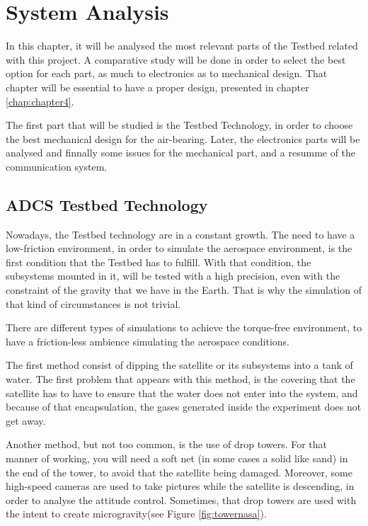 \chapter{System Analysis}
\label{chap:chapter3}

In this chapter, it will be analysed the most relevant parts of the Testbed related with this project. A comparative study will be done in order to select the best option for each part, as much to electronics as to mechanical design. That chapter will be essential to have a proper design, presented in chapter \ref{chap:chapter4}.

The first part that will be studied is the Testbed Technology, in order to choose the best mechanical design for the air-bearing. Later, the electronics parts will be analysed and finnally some issues for the mechanical part, and a resumme of the communication system.

\section{ADCS Testbed Technology}\label{sec:Testbed}

Nowadays, the Testbed technology are in a constant growth. The need to have a low-friction environment, in order to simulate the aerospace environment, is the first condition that the Testbed has to fulfill. With that condition, the subsystems mounted in it, will be tested with a high precision, even with the constraint of the gravity that we have in the Earth. That is why the simulation of that kind of circumstances is not trivial. 

There are different types of simulations to achieve the torque-free environment, to have a friction-less ambience simulating the aerospace conditions. 

The first method consist of dipping the satellite or its subsystems into a tank of water. The first problem that appears with this method, is the covering that the satellite has to have to ensure that the water does not enter into the system, and because of that encapsulation, the gases generated inside the experiment does not get away.

Another method, but not too common, is the use of drop towers. For that manner of working, you will need a soft net (in some cases a solid like sand) in the end of the tower, to avoid that the satellite being damaged. Moreover, some high-speed cameras are used to take pictures while the satellite is descending, in order to analyse the attitude control. \cite{typestestbed}
Sometimes, that drop towers are used with the intent to create microgravity(see Figure \ref{fig:towernasa}). \cite{nasatower} 
 
